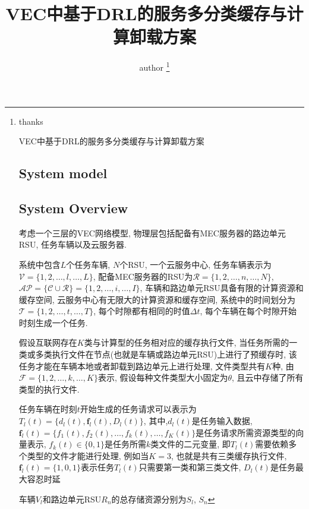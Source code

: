 \documentclass[lettersize,journal]{IEEEtran}
\begin{document}
\title{VEC中基于DRL的服务多分类缓存与计算卸载方案}
\author{author
\thanks{ thanks

%
{VEC中基于DRL的服务多分类缓存与计算卸载方案}

\maketitle

  

\section{System model}
\subsection{System Overview}
考虑一个三层的VEC网络模型, 物理层包括配备有MEC服务器的路边单元RSU, 任务车辆以及云服务器.

系统中包含$L$个任务车辆, $N$个RSU, 一个云服务中心, 任务车辆表示为$ \mathcal{V}=\{ 1,2,\dots,l,\dots,L \} $, 配备MEC服务器的RSU为$ \mathcal{R} = \{ 1,2,\dots,n,\dots,N \} $, $ \mathcal{AP}=\{\mathcal{C}\cup\mathcal{R}\}=\{1,2,\dots,i,\dots,I\} $, 车辆和路边单元RSU具备有限的计算资源和缓存空间, 云服务中心有无限大的计算资源和缓存空间, 系统中的时间划分为$ \mathcal{T}=\{1,2,\dots,t,\dots,T\} $, 每个时隙都有相同的时值$ \Delta t $, 每个车辆在每个时隙开始时刻生成一个任务.

假设互联网存在$ K $类与计算型的任务相对应的缓存执行文件, 当任务所需的一类或多类执行文件在节点(也就是车辆或路边单元RSU)上进行了预缓存时, 该任务才能在车辆本地或者卸载到路边单元上进行处理, 文件类型共有$ K $种, 由$ \mathcal{F} = \{ 1,2,\dots,k,\dots,K \} $表示, 假设每种文件类型大小固定为$ \theta $, 且云中存储了所有类型的执行文件.

任务车辆在时刻$t$开始生成的任务请求可以表示为$ T_{l}(t)=\{ d_{l}(t), \boldsymbol{f}_l(t),D_{l}(t)  \} $, 其中,$d_{l}(t)$是任务输入数据, $ \boldsymbol{f}_{l}(t)=\{ f_1(t),f_2(t),\dots, f_k(t), \dots,f_K(t) \} $是任务请求所需资源类型的向量表示, $ f_k(t) \in \{  0,1\} $是任务所需$ k $类文件的二元变量, 即$ T_{l}(t) $需要依赖多个类型的文件才能进行处理,  例如当$ K=3 $, 也就是共有三类缓存执行文件, $ \boldsymbol{f}_{l}(t)=\{ 1,0, 1 \} $表示任务$  T_{l}(t) $只需要第一类和第三类文件, $ D_{l}(t) $是任务最大容忍时延

车辆$ V_l $和路边单元RSU$ R_n $的总存储资源分别为$ S_l $, $ S_n $


}}
\end{document}

